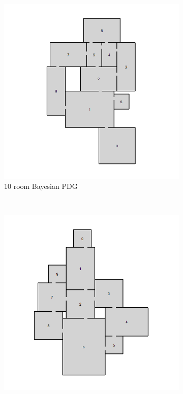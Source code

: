 \documentclass{UoYCSproject}
\begin{document}
\begin{figure}[htb]
  \centering
  \begin{subfigure}[b]{0.45\textwidth}
    \centering
    \includegraphics[width=\textwidth]{figures/generated/BPDG_10_5.jpg}
    \caption{10 room Bayesian PDG}
  \end{subfigure}
  ~
  \begin{subfigure}[b]{0.45\textwidth}
    \centering
    \includegraphics[width=\textwidth]{figures/generated/TheVerminHollow.yaml_7.jpg}

\end{subfigure}
\end{figure}
\end{document}
